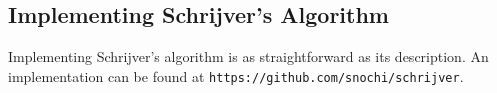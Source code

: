 \documentclass{article}
\begin{document}
\subsection{Implementing Schrijver's Algorithm}

Implementing Schrijver's algorithm is as straightforward as its description. An implementation can be found at \texttt{https://github.com/snochi/schrijver}.






























\clearpage



\end{document}

